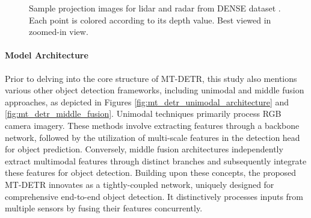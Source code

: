 \documentclass[report.tex]{subfiles}
\begin{document}
\begin{figure}[ht]
        \caption{Sample projection images for lidar and radar from DENSE dataset \cite{bijelic2020seeing}. Each point is colored according to its depth value. Best viewed in zoomed-in view.}
        \label{fig:mt_detr_projection_image}
    \end{figure}

    \paragraph*{Model Architecture}



    Prior to delving into the core structure of MT-DETR, this study also mentions various other object detection frameworks, including unimodal and middle fusion approaches, as depicted in Figures \ref{fig:mt_detr_unimodal_architecture} and \ref{fig:mt_detr_middle_fusion}. Unimodal techniques primarily process RGB camera imagery. These methods involve extracting features through a backbone network, followed by the utilization of multi-scale features in the detection head for object prediction. Conversely, middle fusion architectures independently extract multimodal features through distinct branches and subsequently integrate these features for object detection. Building upon these concepts, the proposed MT-DETR innovates as a tightly-coupled network, uniquely designed for comprehensive end-to-end object detection. It distinctively processes inputs from multiple sensors by fusing their features concurrently.
\end{document}
